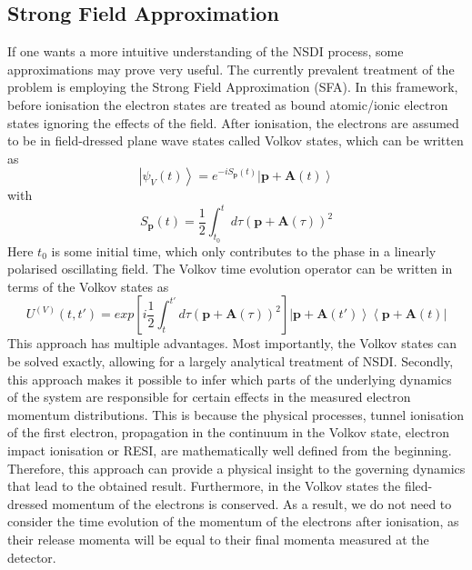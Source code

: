 \documentclass[11pt]{article}
\numberwithin{equation}{section}
\begin{document}
\subsection{Strong Field Approximation}
If one wants a more intuitive understanding of the NSDI process, some approximations may prove very useful. The currently prevalent treatment of the problem is employing the Strong Field Approximation (SFA). In this framework, before ionisation the electron states are treated as bound  atomic/ionic electron states ignoring the effects of the field. After ionisation, the electrons are assumed to be in field-dressed plane wave states called Volkov states, which can be written as
\begin{equation}
    \left | \psi_V (t)\right \rangle = e^{-iS_{\mathbf{p}}(t)} \left | \mathbf{p} + \mathbf{A}(t)\right \rangle
\end{equation}
with 
\begin{equation}
    S_{\mathbf{p}}(t) = \frac{1}{2} \int_{t_0}^t d\tau (\mathbf{p} + \mathbf{A}(\tau))^2
\end{equation}
Here $t_0$ is some initial time, which only contributes to the phase in a linearly polarised oscillating field. The Volkov time evolution operator can be written in terms of the Volkov states as
\begin{equation}\label{eq:Volkov_evolution}
    U^{(V)}(t,t') = exp \left [i \frac{1}{2} \int_t^{t'} d\tau (\mathbf{p} + \mathbf{A}(\tau))^2 \right] \left | \mathbf{p} + \mathbf{A}(t')\right \rangle \left \langle \mathbf{p} + \mathbf{A}(t) \right |
\end{equation}
This approach has multiple advantages. Most importantly, the Volkov states can be solved exactly, allowing for a largely analytical treatment of NSDI. Secondly, this approach makes it possible to infer which parts of the underlying dynamics of the system are responsible for certain effects in the measured electron momentum distributions. This is because the physical processes, tunnel ionisation of the first electron, propagation in the continuum in the Volkov state, electron impact ionisation or RESI, are mathematically well defined from the beginning. Therefore, this approach can provide a physical insight to the governing dynamics that lead to the obtained result. Furthermore, in the Volkov states the filed-dressed momentum of the electrons is conserved. As a result, we do not need to consider the time evolution of the momentum of the electrons after ionisation, as their release momenta will be equal to their final momenta measured at the detector.
\end{document}
